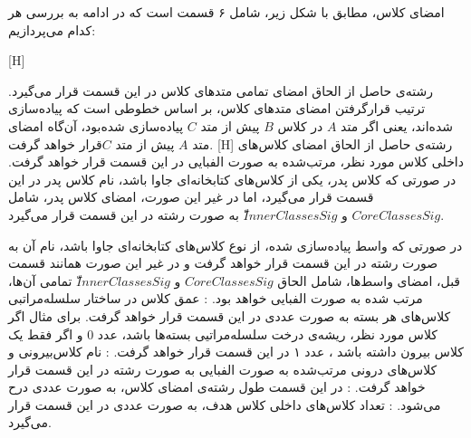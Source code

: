 امضای کلاس، مطابق با شکل زیر، شامل ۶ قسمت است که در ادامه به بررسی هر کدام می‌پردازیم: 

[H]
\vspace{1em}

 رشته‌ی حاصل از الحاق امضای تمامی متد‌های کلاس در این قسمت قرار می‌گیرد. ترتیب قرار‌گرفتن امضای متد‌های کلاس، بر اساس خطوطی است که پیاده‌سازی شده‌اند، یعنی اگر متد $A$ در کلاس $B$ پیش از متد $C$ پیاده‌سازی شده‌بود، آن‌گاه امضای متد $A$ پیش از متد $C$قرار خواهد گرفت.
[H]
\vspace{1em}
 رشته‌ی حاصل از الحاق امضای کلاس‌های داخلی کلاس مورد نظر، مرتب‌شده به صورت الفبایی در این قسمت قرار خواهد گرفت.
 در صورتی که کلاس پدر، یکی از کلاس‌های کتابخانه‌ای جاوا باشد، نام کلاس پدر در این قسمت قرار می‌گیرد، اما در غیر این صورت، امضای کلاس پدر، شامل $CoreClassesSig$ و $ّInnerClassesSig$ به صورت رشته در این قسمت قرار می‌گیرد.

 در صورتی که واسط پیاده‌سازی شده، از نوع کلاس‌های کتابخانه‌ای جاوا باشد، نام آن به صورت رشته در این قسمت قرار خواهد گرفت و در غیر این صورت همانند قسمت قبل، امضای واسط‌ها، شامل الحاق $CoreClassesSig$ و $ّInnerClassesSig$ تمامی آن‌ها، مرتب شده به صورت الفبایی خواهد بود.
: عمق کلاس در ساختار سلسله‌مراتبی کلاس‌های هر بسته به صورت عددی در این قسمت قرار خواهد گرفت. برای مثال اگر کلاس مورد نظر، ریشه‌ی درخت سلسله‌مراتیی بسته‌ها باشد، عدد 0 و اگر فقط یک کلاس بیرون داشته باشد ، عدد ۱ در این قسمت قرار خواهد گرفت.
: نام کلاس‌بیرونی و کلاس‌های درونی مرتب‌شده به صورت الفبایی به صورت رشته در این قسمت قرار خواهد گرفت.
: در این قسمت  طول رشته‌ی امضای کلاس، به صورت عددی درح می‌شود.
: تعداد کلاس‌های داخلی کلاس هدف، به صورت عددی در این قسمت قرار می‌گیرد.

